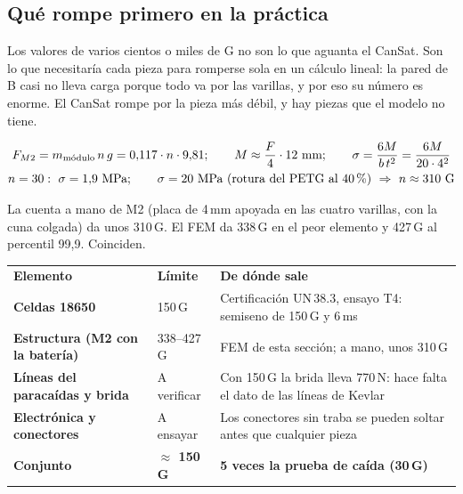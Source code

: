 \documentclass[10pt,a4paper]{article}
\begin{document}
\subsection{Qué rompe primero en la práctica}
Los valores de varios cientos o miles de G no son lo que aguanta el CanSat. Son lo que necesitaría cada pieza para romperse
sola en un cálculo lineal: la pared de B casi no lleva carga porque todo va por las varillas, y por eso su número es enorme.
El CanSat rompe por la pieza más débil, y hay piezas que el modelo no tiene.
\begin{ecu}
\begin{gather}
F_{M2} = m_\text{módulo}\,n\,g = 0{,}117\cdot n\cdot 9{,}81;\qquad
M \approx \frac{F}{4}\cdot 12~\text{mm};\qquad \sigma = \frac{6M}{b\,t^2} = \frac{6M}{20\cdot 4^2}\\
n = 30:\ \sigma = 1{,}9~\text{MPa};\qquad \sigma = 20~\text{MPa (rotura del PETG al 40\,\%)}\ \Rightarrow\ n \approx 310~\text{G}
\end{gather}
\end{ecu}
La cuenta a mano de M2 (placa de 4\,mm apoyada en las cuatro varillas, con la cuna colgada) da unos 310\,G. El FEM da
338\,G en el peor elemento y 427\,G al percentil 99,9. Coinciden.

\par{\small\noindent\begin{tabularx}{\linewidth}{P{4.2cm}P{2.4cm}L}
\color{white}\bfseries Elemento & \color{white}\bfseries Límite & \color{white}\bfseries De dónde sale \\
\bfseries Celdas 18650 & 150\,G & Certificación UN\,38.3, ensayo T4: semiseno de 150\,G y 6\,ms \\
\bfseries Estructura (M2 con la batería) & 338--427\,G & FEM de esta sección; a mano, unos 310\,G \\
\bfseries Líneas del paracaídas y brida & A verificar & Con 150\,G la brida lleva 770\,N: hace falta el dato de las líneas de Kevlar \\
\bfseries Electrónica y conectores & A ensayar & Los conectores sin traba se pueden soltar antes que cualquier pieza \\
\bfseries \bfseries Conjunto & \bfseries \bfseries $\approx$ 150\,G & \bfseries \bfseries 5 veces la prueba de caída (30\,G) \\
\end{tabularx}}
\par\medskip
\end{document}
